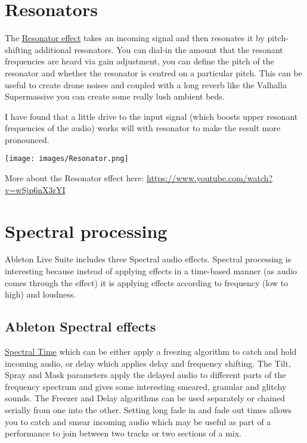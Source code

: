\documentclass[
  12pt,
  letterpaper,
  oneside,
  open=any]{scrbook}
\begin{document}
\section{Resonators}\label{resonators}

The
\href{https://www.ableton.com/en/live-manual/11/live-audio-effect-reference/\#resonators}{Resonator
effect} takes an incoming signal and then resonates it by pitch-shifting
additional resonators. You can dial-in the amount that the resonant
frequencies are heard via gain adjustment, you can define the pitch of
the resonator and whether the resonator is centred on a particular
pitch. This can be useful to create drone noises and coupled with a long
reverb like the Valhalla Supermassive you can create some really lush
ambient beds.

I have found that a little drive to the input signal (which boosts upper
resonant frequencies of the audio) works will with resonator to make the
result more pronounced.

\texttt{[image: images/Resonator.png]}

More about the Resonator effect here:
\url{https://www.youtube.com/watch?v=wSjp6nX3rYI}

\section{Spectral processing}\label{spectral-processing}

Ableton Live Suite includes three Spectral audio effects. Spectral
processing is interesting because instead of applying effects in a
time-based manner (as audio comes through the effect) it is applying
effects according to frequency (low to high) and loudness.

\subsection{Ableton Spectral effects}\label{ableton-spectral-effects}

\href{https://www.ableton.com/en/live-manual/11/live-audio-effect-reference/\#spectral-time}{Spectral
Time} which can be either apply a freezing algorithm to catch and hold
incoming audio, or delay which applies delay and frequency shifting. The
Tilt, Spray and Mask parameters apply the delayed audio to different
parts of the frequency spectrum and gives some interesting smeared,
granular and glitchy sounds. The Freezer and Delay algorithms can be
used separately or chained serially from one into the other. Setting
long fade in and fade out times allows you to catch and smear incoming
audio which may be useful as part of a performance to join between two
tracks or two sections of a mix.
\end{document}
